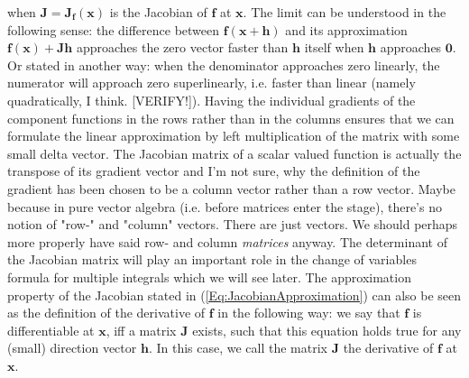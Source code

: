 when $\mathbf{J} = \mathbf{J_f}(\mathbf{x})$ is the Jacobian of  $\mathbf{f}$ at $\mathbf{x}$. The limit can be understood in the following sense: the difference between $\mathbf{f(x+h)}$ and its approximation $\mathbf{f(x) + J h}$ approaches the zero vector faster than $\mathbf{h}$ itself when $\mathbf{h}$ approaches $\mathbf{0}$. Or stated in another way: when the denominator approaches zero linearly, the numerator will approach zero superlinearly, i.e. faster than linear (namely quadratically, I think. [VERIFY!]). Having the individual gradients of the component functions in the rows rather than in the columns ensures that we can formulate the linear approximation by left multiplication of the matrix with some small delta vector. The Jacobian matrix of a scalar valued function is actually the transpose of its gradient vector and I'm not sure, why the definition of the gradient has been chosen to be a column vector rather than a row vector. Maybe because in pure vector algebra (i.e. before matrices enter the stage), there's no notion of "row-" and "column" vectors. There are just vectors. We should perhaps more properly have said row- and column \emph{matrices} anyway. The determinant of the Jacobian matrix will play an important role in the change of variables formula for multiple integrals which we will see later. The approximation property of the Jacobian stated in (\ref{Eq:JacobianApproximation}) can also be seen as the definition of the derivative of $\mathbf{f}$ in the following way: we say that $\mathbf{f}$ is differentiable at $\mathbf{x}$, iff a matrix $\mathbf{J}$ exists, such that this equation holds true for any (small) direction vector $\mathbf{h}$. In this case, we call the matrix $\mathbf{J}$ the derivative of $\mathbf{f}$ at $\mathbf{x}$.






